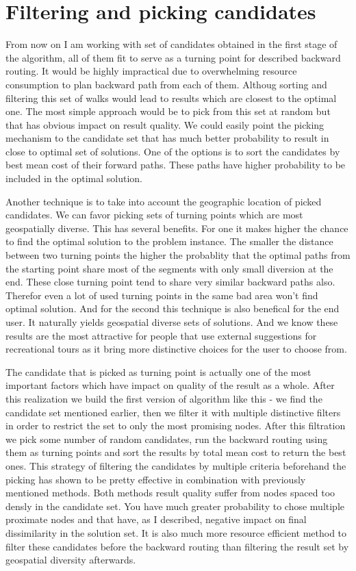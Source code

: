 \documentclass{ctuthesis}
\begin{document}
\section{Filtering and picking candidates}
From now on I am working with set of candidates obtained in the first stage of the algorithm, all of them fit to serve as a turning point for described backward routing. It would be highly impractical due to overwhelming resource consumption to plan backward path from each of them. Althoug sorting and filtering this set of walks would lead to results which are closest to the optimal one. The most simple approach would be to pick from this set at random but that has obvious impact on result quality. We could easily point the picking mechanism to the candidate set that has much better probability to result in close to optimal set of solutions. One of the options is to sort the candidates by best mean cost of their forward paths. These paths have higher probability to be included in the optimal solution.\par
Another technique is to take into account the geographic location of picked candidates. We can favor picking sets of turning points which are most geospatially diverse. This has several benefits. For one it makes higher the chance to find the optimal solution to the problem instance. The smaller the distance between two turning points the higher the probablity that the optimal paths from the starting point share most of the segments with only small diversion at the end. These close turning point tend to share very similar backward paths also. Therefor even a lot of used turning points in the same bad area won't find optimal solution. And for the second this technique is also benefical for the end user. It naturally yields geospatial diverse sets of solutions. And we know these results are the most attractive for people that use external suggestions for recreational tours as it bring more distinctive choices for the user to choose from.\par
The candidate that is picked as turning point is actually one of the most important factors which have impact on quality of the result as a whole. After this realization we build the first version of algorithm like this - we find the candidate set mentioned earlier, then we filter it with multiple distinctive filters in order to restrict the set to only the most promising nodes. After this filtration we pick some number of random candidates, run the backward routing using them as turning points and sort the results by total mean cost to return the best ones. This strategy of filtering the candidates by multiple criteria beforehand the picking has shown to be pretty effective in combination with previously mentioned methods. Both methods result quality suffer from nodes spaced too densly in the candidate set. You have much greater probability to chose multiple proximate nodes and that have, as I described, negative impact on final dissimilarity in the solution set. It is also much more resource efficient method to filter these candidates before the backward routing than filtering the result set by geospatial diversity afterwards. \par
\end{document}
